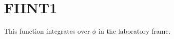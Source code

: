 \section{FIINT1}
\label{sect:fiint1}

\noindent This function integrates over $\phi$ in the laboratory frame.\\
